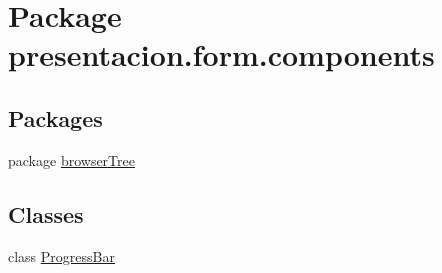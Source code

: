 \hypertarget{namespacepresentacion_1_1form_1_1components}{}\section{Package presentacion.\+form.\+components}
\label{namespacepresentacion_1_1form_1_1components}
\subsection*{Packages}
\begin{DoxyCompactItemize}
\item 
package \hyperlink{namespacepresentacion_1_1form_1_1components_1_1browserTree}{browser\+Tree}
\end{DoxyCompactItemize}
\subsection*{Classes}
\begin{DoxyCompactItemize}
\item 
class \hyperlink{classpresentacion_1_1form_1_1components_1_1ProgressBar}{Progress\+Bar}
\end{DoxyCompactItemize}
